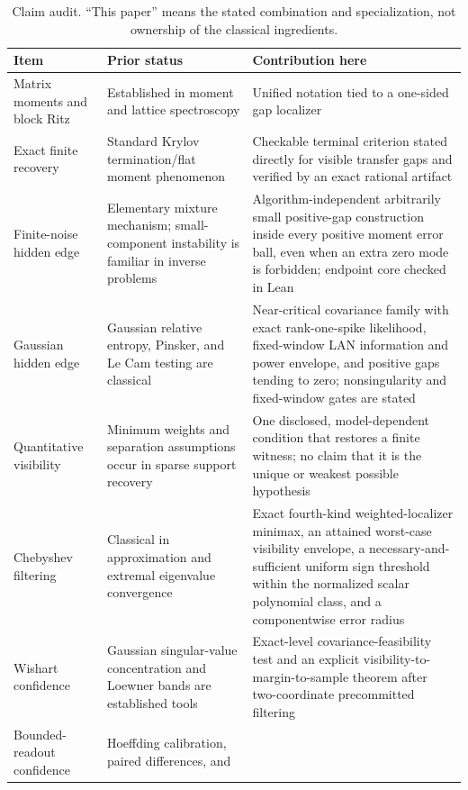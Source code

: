 \documentclass[11pt]{article}
\theoremstyle{definition}
\theoremstyle{remark}
\begin{document}
\clearpage
\enlargethispage{8pt}
\begin{table}[H]
\centering
\small
\caption{Claim audit.  ``This paper'' means the stated combination and
specialization, not ownership of the classical ingredients.}
\begin{tabularx}{\linewidth}{>{\raggedright\arraybackslash}p{.28\linewidth}
>{\raggedright\arraybackslash}p{.32\linewidth}
>{\raggedright\arraybackslash}X}
\toprule
Item & Prior status & Contribution here\\
\midrule
Matrix moments and block Ritz & Established in moment and lattice spectroscopy
& Unified notation tied to a one-sided gap localizer\\
Exact finite recovery & Standard Krylov termination/flat moment phenomenon
& Checkable terminal criterion stated directly for visible transfer gaps and
verified by an exact rational artifact\\
Finite-noise hidden edge & Elementary mixture mechanism; small-component
instability is familiar in inverse problems
& Algorithm-independent arbitrarily small positive-gap construction inside
every positive moment error ball, even when an extra zero mode is forbidden;
endpoint core checked in Lean\\
Gaussian hidden edge & Gaussian relative entropy, Pinsker, and Le Cam testing
are classical
& Near-critical covariance family with exact rank-one-spike likelihood,
fixed-window LAN information and power envelope, and positive gaps tending to
zero; nonsingularity and fixed-window gates are stated\\
Quantitative visibility & Minimum weights and separation assumptions occur in
sparse support recovery
& One disclosed, model-dependent condition that restores a finite witness; no
claim that it is the unique or weakest possible hypothesis\\
Chebyshev filtering & Classical in approximation and extremal eigenvalue
convergence
& Exact fourth-kind weighted-localizer minimax, an attained worst-case
visibility envelope, a necessary-and-sufficient uniform sign threshold within
the normalized scalar polynomial class, and a componentwise error radius\\
Wishart confidence & Gaussian singular-value concentration and Loewner bands
are established tools
& Exact-level covariance-feasibility test and an explicit
visibility-to-margin-to-sample theorem after two-coordinate precommitted
filtering\\
Bounded-readout confidence & Hoeffding calibration, paired differences, and

\end{tabularx}
\end{table}
\end{document}
